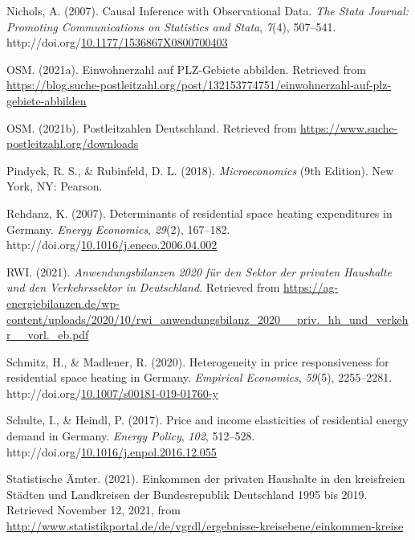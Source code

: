 \documentclass[12pt,twoside]{reedthesis}
\newlength{\cslhangindent}
\newenvironment{CSLReferences}[2] %
 {%
  \setlength{\parindent}{0pt}
  \ifodd #1 \everypar{\setlength{\hangindent}{\cslhangindent}}\ignorespaces\fi
  \ifnum #2 > 0
  \setlength{\parskip}{#2\baselineskip}
  \fi
 }%
 {}
\begin{document}
\begin{CSLReferences}{1}{0}
\leavevmode{}%
Nichols, A. (2007). Causal Inference with Observational Data. \emph{The Stata Journal: Promoting Communications on Statistics and Stata}, \emph{7}(4), 507--541. http://doi.org/\href{https://doi.org/10.1177/1536867X0800700403}{10.1177/1536867X0800700403}

\leavevmode{}%
OSM. (2021a). Einwohnerzahl auf PLZ-Gebiete abbilden. Retrieved from \url{https://blog.suche-postleitzahl.org/post/132153774751/einwohnerzahl-auf-plz-gebiete-abbilden}

\leavevmode{}%
OSM. (2021b). Postleitzahlen Deutschland. Retrieved from \url{https://www.suche-postleitzahl.org/downloads}

\leavevmode{}%
Pindyck, R. S., \& Rubinfeld, D. L. (2018). \emph{Microeconomics} (9th Edition). New York, NY: Pearson.

\leavevmode{}%
Rehdanz, K. (2007). Determinants of residential space heating expenditures in Germany. \emph{Energy Economics}, \emph{29}(2), 167--182. http://doi.org/\href{https://doi.org/10.1016/j.eneco.2006.04.002}{10.1016/j.eneco.2006.04.002}

\leavevmode{}%
RWI. (2021). \emph{Anwendungsbilanzen 2020 für den Sektor der privaten Haushalte und den Verkehrssektor in Deutschland}. Retrieved from \url{https://ag-energiebilanzen.de/wp-content/uploads/2020/10/rwi_anwendungsbilanz_2020__priv._hh_und_verkehr__vorl._eb.pdf}

\leavevmode{}%
Schmitz, H., \& Madlener, R. (2020). Heterogeneity in price responsiveness for residential space heating in Germany. \emph{Empirical Economics}, \emph{59}(5), 2255--2281. http://doi.org/\href{https://doi.org/10.1007/s00181-019-01760-y}{10.1007/s00181-019-01760-y}

\leavevmode{}%
Schulte, I., \& Heindl, P. (2017). Price and income elasticities of residential energy demand in Germany. \emph{Energy Policy}, \emph{102}, 512--528. http://doi.org/\href{https://doi.org/10.1016/j.enpol.2016.12.055}{10.1016/j.enpol.2016.12.055}

\leavevmode{}%
Statistische Ämter. (2021). Einkommen der privaten Haushalte in den kreisfreien Städten und Landkreisen der Bundesrepublik Deutschland 1995 bis 2019. Retrieved November 12, 2021, from \url{http://www.statistikportal.de/de/vgrdl/ergebnisse-kreisebene/einkommen-kreise}


\end{CSLReferences}
\end{document}
